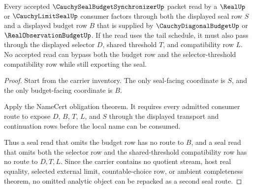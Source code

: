 \begin{theorem}
\label{thm:cauchy-seal-budget-synchronizer-nonescape}
Every accepted $\CauchySealBudgetSynchronizerUp$ packet read by a $\RealUp$ or $\CauchyLimitSealUp$ consumer factors through both the displayed seal row $S$ and a displayed budget row $B$ that is supplied by $\CauchyDiagonalBudgetUp$ or $\RealObservationBudgetUp$. If the read uses the tail schedule, it must also pass through the displayed selector $D$, shared threshold $T$, and compatibility row $L$. No accepted read can bypass both the budget row and the selector-threshold compatibility row while still exporting the seal.
\end{theorem}
\begin{proof}
Start from the carrier inventory. The only seal-facing coordinate is $S$, and the only budget-facing coordinate is $B$.

Apply the NameCert obligation theorem. It requires every admitted consumer route to expose $D$, $B$, $T$, $L$, and $S$ through the displayed transport and continuation rows before the local name can be consumed.

Thus a seal read that omits the budget row has no route to $B$, and a seal read that omits both the selector row and the shared-threshold compatibility row has no route to $D,T,L$. Since the carrier contains no quotient stream, host real equality, selected external limit, countable-choice row, or ambient completeness theorem, no omitted analytic object can be repacked as a second seal route.
\end{proof}


